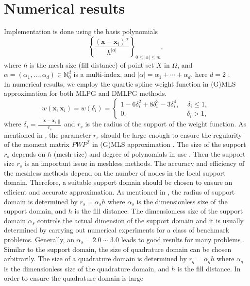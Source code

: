 \documentclass[12pt]{article}
\numberwithin{equation}{section}
\begin{document}
\section{Numerical results}
Implementation is done using the basis polynomials
\[{\left\{ {\frac{{{{(\mathbf x - {\mathbf x_i})}^\alpha }}}{{{h^{\left| \alpha  \right|}}}}} \right\}_{0 \le \left| \alpha  \right| \le m}},\]
where $h$ is the mesh size (fill distance) of point set $X$ in $\Omega$, and $\alpha  = ({\alpha _1},...,{\alpha _d}) \in \mathbb N_0^d$
is a
multi-index, and $\left| \alpha  \right| = {\alpha _1} + \cdots + {\alpha _d}$, here $d = 2$ \cite{Mirzaei4}.\\
In numerical results, we employ the quartic spline weight function in (G)MLS approximation for both MLPG and DMLPG methods.
\[w(\mathbf{x},{\mathbf{x}_i}) = w({\delta _i}) = \left\{ \begin{array}{l}
1 - 6\delta _i^2 + 8\delta _i^3 - 3\delta _i^4,\,\,\,\,\,\,\,{\delta _i} \le 1,\\
0,\,\,\,\,\,\,\,\,\,\,\,\,\,\,\,\,\,\,\,\,\,\,\,\,\,\,\,\,\,\,\,\,\,\,\,\,\,\,\,\,\,\,\,\,\,\,\,\,\,\,\,\,\,{\delta _i} > 1,
\end{array} \right.\]
where ${\delta _i} = \frac{{\left\| {\mathbf{x} - {\mathbf{x}_i}} \right\|}}{{{r_s}}}$ and $r_s$ is the radius of the support of the weight function. As mentioned in  \cite{MirzaeiT, MirzaeiH}, the parameter $r _s$ should be large enough to ensure the regularity of the moment matrix $PW{P^T}$ in (G)MLS approximation \cite{MirzaeiT, MirzaeiH}. The size of the support $r_s$ depends on $h$ (mesh-size) and degree of polynomials in use \cite{MirzaeiT}. Then the support size $r_s$ is an
important issue in meshless methods. The accuracy and efficiency of the meshless methods depend on the
number of nodes in the local support domain. Therefore, a suitable
support domain should be chosen to ensure an efficient and accurate
approximation. As mentioned in \cite{Liu}, the radius of support domain is determined by $r_s=\alpha_{s}h$ where $\alpha_s$ is the dimensionless size of the support domain, and $h$  is the fill distance. The dimensionless size of the support domain $\alpha_s$ controls the actual
dimension of the support domain and it is usually determined by carrying out numerical
experiments for a class of benchmark problems. Generally, an $\alpha_s=2.0\sim3.0$ leads to good results for many problems \cite{Liu}. Similar to the support domain, the size of quadrature domain can be chosen arbitrarily. The size of a quadrature domain is determined by $r_q=\alpha_{q}h$ where $\alpha_q$ is the dimensionless size of the quadrature domain, and $h$  is the fill distance. In order to ensure the quadrature domain is large
\end{document}

